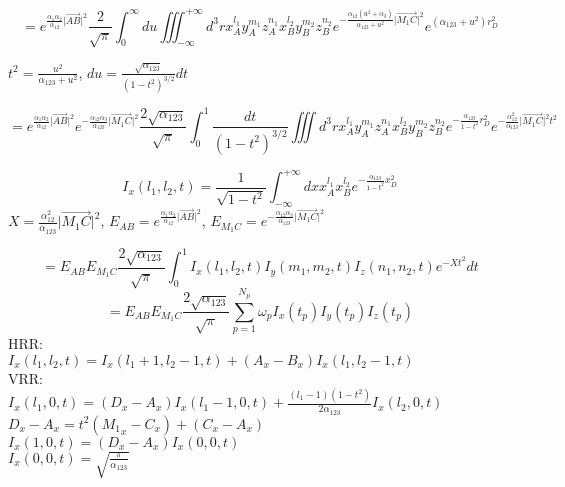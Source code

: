 \documentclass{article}
\begin{document}
	\begin{displaymath}
		=e^{\frac{\alpha_1\alpha_2}{\alpha_{12}} \vert \overrightarrow{AB} \vert^2}
		\frac{2}{\sqrt{\pi}}\int_0^{\infty}du \iiint^{+\infty}_{-\infty}d^3r
		x^{l_1}_A y^{m_1}_A z^{n_1}_A x_B^{l_2} y_B^{m_2} z_B^{n_2}
		e^{-\frac{\alpha_{12}(u^2+\alpha_3)}{\alpha_{123}+u^2} \vert \overrightarrow{M_1C} \vert^2}
		e^{(\alpha_{123}+u^2)r_D^2}
	\end{displaymath}
	\begin{center}
		$t^2=\frac{u^2}{\alpha_{123}+u^2}$, $du=\frac{\sqrt{\alpha_{123}}}{(1-t^2)^{3/2}}dt$
	\end{center}
	\begin{displaymath}
		=e^{\frac{\alpha_1\alpha_2}{\alpha_{12}} \vert \overrightarrow{AB} \vert^2} 
		e^{-\frac{\alpha_{12}\alpha_3}{\alpha_{123}} \vert \overrightarrow{M_1C} \vert^2}
		\frac{2\sqrt{\alpha_{123}}}{\sqrt{\pi}} \int_0^1 \frac{dt}{(1-t^2)^{3/2}}
		\iiint d^3r x^{l_1}_A y^{m_1}_A z^{n_1}_A x_B^{l_2} y_B^{m_2} z_B^{n_2}
		e^{-\frac{\alpha_{123}}{1-t^2}r_D^2}
		e^{-\frac{\alpha_{12}^2}{\alpha_{123}}\vert \overrightarrow{M_1C} \vert^2t^2}
	\end{displaymath}
	\begin{center}
		$$
			I_x(l_1,l_2,t)=\frac{1}{\sqrt{1-t^2}}
			\int^{+\infty}_{-\infty}dxx^{l_1}_Ax_B^{l_2}e^{-\frac{\alpha_{123}}{1-t^2}x_D^2}
		$$
		$	X=\frac{\alpha_{12}^2}{\alpha_{123}} \vert \overrightarrow{M_1C} \vert^2	$,
		$	E_{AB}=e^{\frac{\alpha_1\alpha_2}{\alpha_{12}} \vert \overrightarrow{AB} \vert^2} 	$,
		$	E_{M_1C}=e^{-\frac{\alpha_{12}\alpha_3}{\alpha_{123}} \vert \overrightarrow{M_1C} \vert^2}	$
	\end{center}
	\begin{displaymath}
		=E_{AB}E_{M_1C} \frac{2\sqrt{\alpha_{123}}}{\sqrt{\pi}}
		\int_0^1 I_x(l_1,l_2,t) I_y(m_1,m_2,t) I_z(n_1,n_2,t) e^{-Xt^2} dt
	\end{displaymath}
	\begin{displaymath}
		=E_{AB}E_{M_1C} \frac{2\sqrt{\alpha_{123}}}{\sqrt{\pi}}
		\sum_{p=1}^{N_p} \omega_p I_x(t_p) I_y(t_p) I_z(t_p)
	\end{displaymath}
	HRR:\\
		$	I_x(l_1,l_2,t)=I_x(l_1+1,l_2-1,t)+(A_x-B_x)I_x(l_1,l_2-1,t)	$\\
	VRR:\\
		$	I_x(l_1,0,t)=(D_x-A_x)I_x(l_1-1,0,t)+\frac{(l_1-1)(1-t^2)}{2\alpha_{123}}I_x(l_2,0,t)	$\\
		$	D_x-A_x=t^2({M_1}_x-C_x)+(C_x-A_x)	$\\
		$	I_x(1,0,t)=(D_x-A_x)I_x(0,0,t)	$\\
		$	I_x(0,0,t)=\sqrt{\frac{\pi}{\alpha_{123}}}	$\\
		
\end{document}

